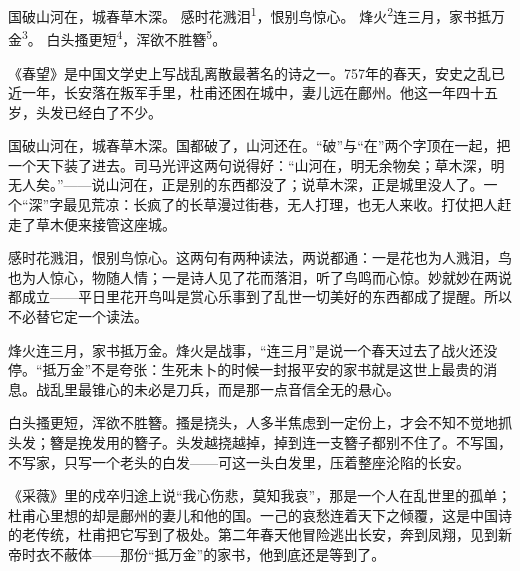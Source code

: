 
\begin{poem}
国破山河在，城春草木深。
感时花溅泪\textsuperscript{1}，恨别鸟惊心。
烽火\textsuperscript{2}连三月，家书抵万金\textsuperscript{3}。
白头搔更短\textsuperscript{4}，浑欲不胜簪\textsuperscript{5}。
\end{poem}

\begin{annotations}
\end{annotations}

\begin{appreciation}
《春望》是中国文学史上写战乱离散最著名的诗之一。757年的春天，安史之乱已近一年，长安落在叛军手里，杜甫还困在城中，妻儿远在鄜州。他这一年四十五岁，头发已经白了不少。

国破山河在，城春草木深。国都破了，山河还在。“破”与“在”两个字顶在一起，把一个天下装了进去。司马光评这两句说得好：“山河在，明无余物矣；草木深，明无人矣。”——说山河在，正是别的东西都没了；说草木深，正是城里没人了。一个“深”字最见荒凉：长疯了的长草漫过街巷，无人打理，也无人来收。打仗把人赶走了草木便来接管这座城。

感时花溅泪，恨别鸟惊心。这两句有两种读法，两说都通：一是花也为人溅泪，鸟也为人惊心，物随人情；一是诗人见了花而落泪，听了鸟鸣而心惊。妙就妙在两说都成立——平日里花开鸟叫是赏心乐事到了乱世一切美好的东西都成了提醒。所以不必替它定一个读法。

烽火连三月，家书抵万金。烽火是战事，“连三月”是说一个春天过去了战火还没停。“抵万金”不是夸张：生死未卜的时候一封报平安的家书就是这世上最贵的消息。战乱里最锥心的未必是刀兵，而是那一点音信全无的悬心。

白头搔更短，浑欲不胜簪。搔是挠头，人多半焦虑到一定份上，才会不知不觉地抓头发；簪是挽发用的簪子。头发越挠越掉，掉到连一支簪子都别不住了。不写国，不写家，只写一个老头的白发——可这一头白发里，压着整座沦陷的长安。

《采薇》里的戍卒归途上说“我心伤悲，莫知我哀”，那是一个人在乱世里的孤单；杜甫心里想的却是鄜州的妻儿和他的国。一己的哀愁连着天下之倾覆，这是中国诗的老传统，杜甫把它写到了极处。第二年春天他冒险逃出长安，奔到凤翔，见到新帝时衣不蔽体——那份“抵万金”的家书，他到底还是等到了。
\end{appreciation}
